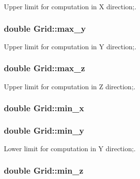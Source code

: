Upper limit for computation in X direction;. 

\hypertarget{classGrid_a8f3f3adf7d9a7bfe12f842603fd78787}{
\subsubsection[{max\_\-y}]{\setlength{\rightskip}{0pt plus 5cm}double {\bf Grid::max\_\-y}}}
\label{classGrid_a8f3f3adf7d9a7bfe12f842603fd78787}


Upper limit for computation in Y direction;. 

\hypertarget{classGrid_a4c93a619b7ef2501f1eb16cb0efc4a09}{
\subsubsection[{max\_\-z}]{\setlength{\rightskip}{0pt plus 5cm}double {\bf Grid::max\_\-z}}}
\label{classGrid_a4c93a619b7ef2501f1eb16cb0efc4a09}


Upper limit for computation in Z direction;. 

\hypertarget{classGrid_a16930d1358fd0b70fc84031dbd1b6149}{
\subsubsection[{min\_\-x}]{\setlength{\rightskip}{0pt plus 5cm}double {\bf Grid::min\_\-x}}}
\label{classGrid_a16930d1358fd0b70fc84031dbd1b6149}
\hypertarget{classGrid_ac5c22ae5c418071029cd7b4613704be3}{
\subsubsection[{min\_\-y}]{\setlength{\rightskip}{0pt plus 5cm}double {\bf Grid::min\_\-y}}}
\label{classGrid_ac5c22ae5c418071029cd7b4613704be3}


Lower limit for computation in Y direction;. 

\hypertarget{classGrid_a492df49b72c09feb4e9c5ab2e28ece24}{
\subsubsection[{min\_\-z}]{\setlength{\rightskip}{0pt plus 5cm}double {\bf Grid::min\_\-z}}}
\label{classGrid_a492df49b72c09feb4e9c5ab2e28ece24}


